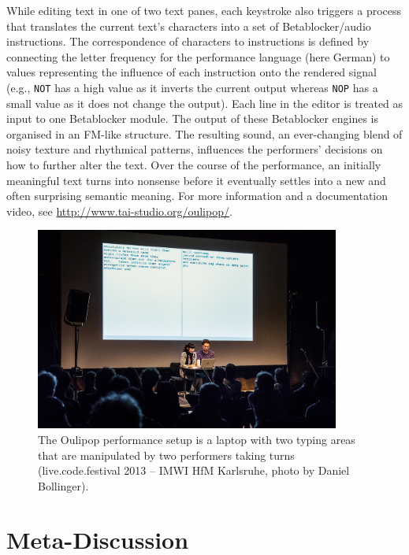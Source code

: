 \documentclass[letterpaper, 12pt]{article}
\begin{document}
While editing text in one of two text panes, each keystroke also triggers a process that translates the current text's characters into a set of Betablocker/audio instructions.
The correspondence of characters to instructions is defined by connecting the letter frequency for the performance language (here German) to values representing the influence of each instruction onto the rendered signal (e.g., \texttt{NOT} has a high value as it inverts the current output whereas \texttt{NOP} has a small value as it does not change the output).
Each line in the editor is treated as input to one Betablocker module.
The output of these Betablocker engines is organised in an FM-like structure.
The resulting sound, an ever-changing blend of noisy texture and rhythmical patterns, influences the performers' decisions on how to further alter the text.
Over the course of the performance, an initially meaningful text turns into nonsense before it eventually settles into a new and often surprising semantic meaning. 
For more information and a documentation video, see \url{http://www.tai-studio.org/oulipop/}.
\begin{figure}
	\centering
		\includegraphics[width=10cm]{20130420-live-code-fest-20}
	\caption{The Oulipop performance setup is a laptop with two typing areas that are manipulated by two performers taking turns (live.code.festival 2013 -- IMWI HfM Karlsruhe, photo by Daniel Bollinger).}
	\label{fig:fig_20120509-IMG_3278}
\end{figure}
\parskip 18pt

\section{Meta-Discussion}
\label{sec:meta}

\end{document}
